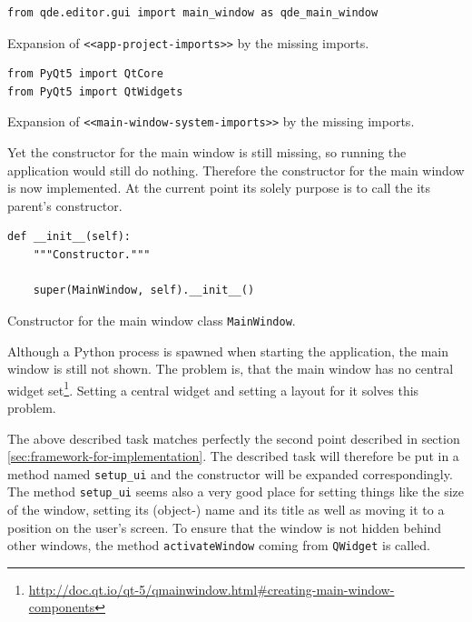 \documentclass[10pt, openright, notitlepage]{scrreprt}
\begin{document}
\begin{listing}[H]
\begin{verbatim}
from qde.editor.gui import main_window as qde_main_window
\end{verbatim}
\caption{\label{app-project-imports}
Expansion of \texttt{<<app-project-imports>>} by the missing imports.}
\end{listing}

\begin{listing}[H]
\begin{verbatim}
from PyQt5 import QtCore
from PyQt5 import QtWidgets
\end{verbatim}
\caption{\label{main-window-system-imports}
Expansion of \texttt{<<main-window-system-imports>>} by the missing imports.}
\end{listing}

Yet the constructor for the main window is still missing, so running the
application would still do nothing. Therefore the constructor for the main
window is now implemented. At the current point its solely purpose is to call
the its parent's constructor.

\begin{listing}[H]
\begin{verbatim}
def __init__(self):
    """Constructor."""

    super(MainWindow, self).__init__()
\end{verbatim}
\caption{\label{main-window-constructor}
Constructor for the main window class \texttt{MainWindow}.}
\end{listing}

Although a Python process is spawned when starting the application, the main
window is still not shown. The problem is, that the main window has no central
widget
set\footnote{\url{http://doc.qt.io/qt-5/qmainwindow.html\#creating-main-window-components}}.
Setting a central widget and setting a layout for it solves this problem.

The above described task matches perfectly the second point described in section
\ref{sec:framework-for-implementation}. The described task will therefore be put in a
method named \texttt{setup\_ui} and the constructor will be expanded correspondingly.
The method \texttt{setup\_ui} seems also a very good place for setting things like the
size of the window, setting its (object-) name and its title as well as moving
it to a position on the user's screen. To ensure that the window is not hidden
behind other windows, the method \texttt{activateWindow} coming from \texttt{QWidget} is
called.
\end{document}
